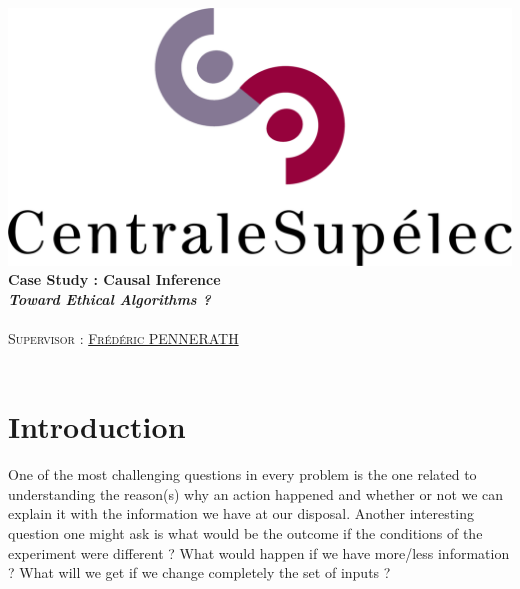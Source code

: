 \documentclass{article}
\author{\Large \textsc{\href{mailto:mohammed.fellaji@supelec.fr}{Mohammed FELLAJI}, \href{mailto:ahmed.benaissa@supelec.fr}{Ahmed BEN AISSA}}}
\date{September, 2020}
\begin{document}
\hypersetup{pdfborder=0 0 0} 		

\makeatletter
  \begin{titlepage}
  \centering
     {\large \textsc{   }}\\
     \vspace{1em}
    \centering
      \includegraphics[width=0.5 \textwidth]{../figures/LogoCS.png} \\
    \vspace{4cm}
      {\LARGE\textbf{Case Study : Causal Inference}\\  
       \vspace{1em}
       {\large\textbf{
       \textit{\LARGE{Toward Ethical Algorithms ?}}}}\\  
    \vspace{4cm}
    \centering
     {\Large \@author} \\
     \vspace{1em}
        {\Large \textsc{Supervisor : \href{mailto:frederic.pennerath@centralesupelec.fr}{Frédéric PENNERATH}}}\\
        \vspace{3em}
        {\Large \@date} }\\
  \end{titlepage}
 
 
\makeatother

\tableofcontents





\newpage
\section{Introduction}
One of the most challenging questions in every problem is the one related to understanding the reason(s) why an action happened and whether or not we can explain it with the information we have at our disposal. Another interesting question one might ask is what would be the outcome if the conditions of the experiment were different ? What would happen if we have more/less information ? What will we get if we change completely the set of inputs ?
\end{document}
